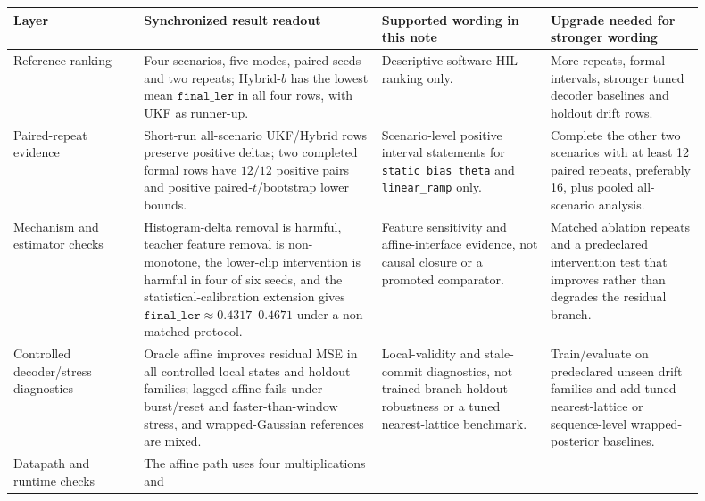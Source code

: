 \documentclass[11pt]{article}
\begin{document}
\begin{table}[ht]
\centering
\scriptsize
\setlength{\tabcolsep}{3pt}
\begin{tabular}{>{\raggedright\arraybackslash}p{0.17\linewidth}
                >{\raggedright\arraybackslash}p{0.31\linewidth}
                >{\raggedright\arraybackslash}p{0.22\linewidth}
                >{\raggedright\arraybackslash}p{0.20\linewidth}}
\toprule
Layer & Synchronized result readout & Supported wording in this note & Upgrade needed for stronger wording \\
\midrule
Reference ranking & Four scenarios, five modes, paired seeds and two repeats;
Hybrid-\(b\) has the lowest mean \(\texttt{final\_ler}\) in all four rows,
with UKF as runner-up. & Descriptive software-HIL ranking only. &
More repeats, formal intervals, stronger tuned decoder baselines and holdout
drift rows. \\
\addlinespace
Paired-repeat evidence & Short-run all-scenario UKF/Hybrid rows preserve
positive deltas; two completed formal rows have \(12/12\) positive pairs and
positive paired-\(t\)/bootstrap lower bounds. & Scenario-level positive
interval statements for \texttt{static\_bias\_theta} and \texttt{linear\_ramp}
only. & Complete the other two scenarios with at least 12 paired repeats,
preferably 16, plus pooled all-scenario analysis. \\
\addlinespace
Mechanism and estimator checks & Histogram-delta removal is harmful, teacher
feature removal is non-monotone, the lower-clip intervention is harmful in
four of six seeds, and the statistical-calibration extension gives
\(\texttt{final\_ler}\approx0.4317\)--\(0.4671\) under a non-matched protocol. &
Feature sensitivity and affine-interface evidence, not causal closure or a
promoted comparator. & Matched ablation repeats and a predeclared
intervention test that improves rather than degrades the residual branch. \\
\addlinespace
Controlled decoder/stress diagnostics & Oracle affine improves residual MSE in
all controlled local states and holdout families; lagged affine fails under
burst/reset and faster-than-window stress, and wrapped-Gaussian references are
mixed. & Local-validity and stale-commit diagnostics, not trained-branch
holdout robustness or a tuned nearest-lattice benchmark. & Train/evaluate on
predeclared unseen drift families and add tuned nearest-lattice or
sequence-level wrapped-posterior baselines. \\
\addlinespace
Datapath and runtime checks & The affine path uses four multiplications and

\end{tabular}
\end{table}
\end{document}
